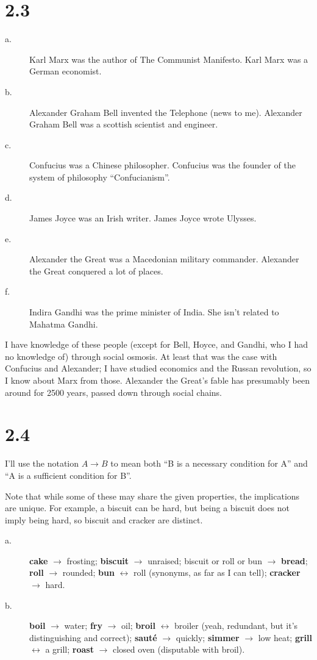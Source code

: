 \documentclass[12pt]{article}
\begin{document}
\section*{2.3}
\begin{description}
\item[a.] Karl Marx was the author of The Communist Manifesto.  Karl
Marx was a German economist.
\item[b.] Alexander Graham Bell invented the Telephone (news to me).
Alexander Graham Bell was a scottish scientist and engineer.
\item[c.] Confucius was a Chinese philosopher.  Confucius was the
founder of the system of philosophy ``Confucianism''.
\item[d.] James Joyce was an Irish writer.  James Joyce wrote Ulysses.
\item[e.] Alexander the Great was a Macedonian military commander.
Alexander the Great conquered a lot of places.
\item[f.] Indira Gandhi was the prime minister of India.  She isn't
related to Mahatma Gandhi.
\end{description}

I have knowledge of these people (except for Bell, Hoyce, and Gandhi,
who I had no knowledge of) through social osmosis.  At least that was
the case with Confucius and Alexander; I have studied economics and the
Russan revolution, so I know about Marx from those.  Alexander the
Great's fable has presumably been around for 2500 years, passed down
through social chains.

\section*{2.4}
I'll use the notation $A \rightarrow B$ to mean both ``B is a necessary
condition for A'' and ``A is a sufficient condition for B''.

Note that while some of these may share the given properties, the
implications are unique.  For example, a biscuit can be hard, but being
a biscuit does not imply being hard, so biscuit and cracker are
distinct.

\begin{description}
\item[a.] \textbf{cake} $\rightarrow$ frosting; \textbf{biscuit}
 $\rightarrow$ unraised; biscuit or roll or bun $\rightarrow$
 \textbf{bread}; \textbf{roll} $\rightarrow$ rounded; \textbf{bun}
 $\leftrightarrow$ roll (synonyms, as far as I can tell);
 \textbf{cracker} $\rightarrow$ hard.
\item[b.] \textbf{boil} $\rightarrow$ water; \textbf{fry} $\rightarrow$
 oil; \textbf{broil} $\leftrightarrow$ broiler (yeah, redundant, but it's
 distinguishing and correct); \textbf{saut\'e} $\rightarrow$ quickly;
 \textbf{simmer} $\rightarrow$ low heat; \textbf{grill} $\leftrightarrow$
 a grill; \textbf{roast} $\rightarrow$ closed oven (disputable with
 broil).
\end{description}
\end{document}
